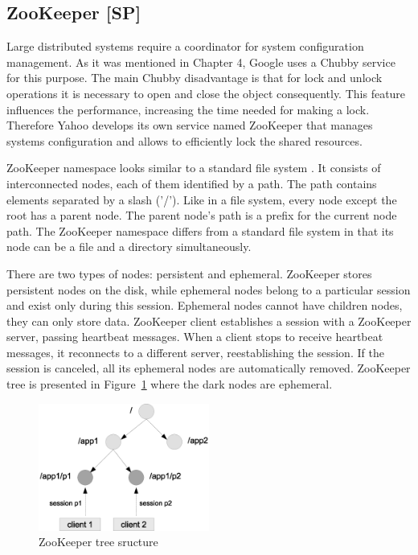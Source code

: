 \subsection{ZooKeeper [SP]}

Large distributed systems require a coordinator for system configuration management.
As it was mentioned in Chapter 4, Google uses a Chubby service for this purpose.
The main Chubby disadvantage is that for lock and unlock operations it is necessary to open and close the object consequently.
This feature influences the performance, increasing the time needed for making a lock.
Therefore Yahoo develops its own service named ZooKeeper that manages systems configuration and allows to efficiently lock the shared resources.

ZooKeeper namespace looks similar to a standard file system \cite{Zookeeper}.
It consists of interconnected nodes, each of them identified by a path.
The path contains elements separated by a slash ('/').
Like in a file system, every node except the root has a parent node.
The parent node's path is a prefix for the current node path.
The ZooKeeper namespace differs from a standard file system in that its node can be a file and a directory simultaneously.

There are two types of nodes: persistent and ephemeral.
ZooKeeper stores persistent nodes on the disk, while ephemeral nodes belong to a particular session and exist only during this session.
Ephemeral nodes cannot have children nodes, they can only store data.
ZooKeeper client establishes a session with a ZooKeeper server, passing heartbeat messages.
When a client stops to receive heartbeat messages, it reconnects to a different server, reestablishing the session.
If the session is canceled, all its ephemeral nodes are automatically removed.
ZooKeeper tree is presented in Figure~\ref{fig:zookeeper_tree} where the dark nodes are ephemeral.

\begin{figure}
  \centering
  \includegraphics [width=0.5\textwidth]{images/zookeeper_tree}
  \caption{ZooKeeper tree sructure}
  \label{fig:zookeeper_tree}
\end{figure}

